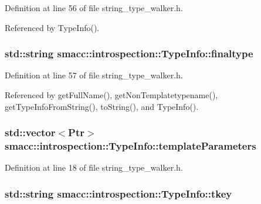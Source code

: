 Definition at line 56 of file string\+\_\+type\+\_\+walker.\+h.



Referenced by Type\+Info().

\subsubsection[{\texorpdfstring{finaltype}{finaltype}}]{\setlength{\rightskip}{0pt plus 5cm}std\+::string smacc\+::introspection\+::\+Type\+Info\+::finaltype\hspace{0.3cm}{\ttfamily [private]}}\hypertarget{classsmacc_1_1introspection_1_1TypeInfo_aa4010ed427e12db443e08ab16a3de243}{}\label{classsmacc_1_1introspection_1_1TypeInfo_aa4010ed427e12db443e08ab16a3de243}


Definition at line 57 of file string\+\_\+type\+\_\+walker.\+h.



Referenced by get\+Full\+Name(), get\+Non\+Templatetypename(), get\+Type\+Info\+From\+String(), to\+String(), and Type\+Info().

\subsubsection[{\texorpdfstring{template\+Parameters}{templateParameters}}]{\setlength{\rightskip}{0pt plus 5cm}std\+::vector$<${\bf Ptr}$>$ smacc\+::introspection\+::\+Type\+Info\+::template\+Parameters}\hypertarget{classsmacc_1_1introspection_1_1TypeInfo_aed5166ab8bcd94489e7bc87deb01de5c}{}\label{classsmacc_1_1introspection_1_1TypeInfo_aed5166ab8bcd94489e7bc87deb01de5c}


Definition at line 18 of file string\+\_\+type\+\_\+walker.\+h.

\subsubsection[{\texorpdfstring{tkey}{tkey}}]{\setlength{\rightskip}{0pt plus 5cm}std\+::string smacc\+::introspection\+::\+Type\+Info\+::tkey\hspace{0.3cm}{\ttfamily [private]}}\hypertarget{classsmacc_1_1introspection_1_1TypeInfo_a697dd505119258dba1224d10eea5b2bd}{}\label{classsmacc_1_1introspection_1_1TypeInfo_a697dd505119258dba1224d10eea5b2bd}


